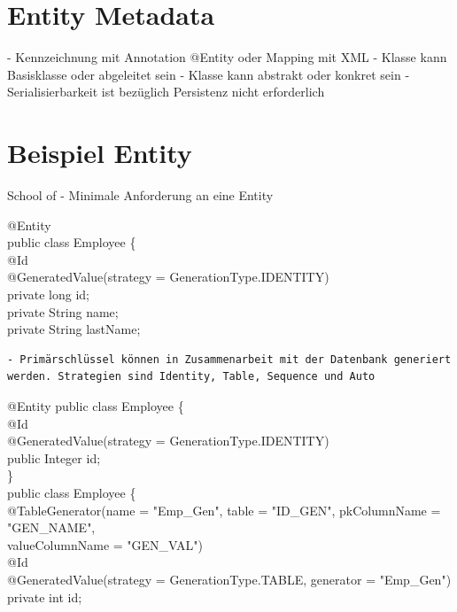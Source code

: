 \documentclass[10pt]{article}
\begin{document}
\section*{Entity Metadata}
- Kennzeichnung mit Annotation @Entity oder Mapping mit XML
- Klasse kann Basisklasse oder abgeleitet sein
- Klasse kann abstrakt oder konkret sein
- Serialisierbarkeit ist bezüglich Persistenz nicht erforderlich

\section*{Beispiel Entity}

School of
- Minimale Anforderung an eine Entity


@Entity\\
public class Employee \{\\
@Id\\
@GeneratedValue(strategy = GenerationType.IDENTITY)\\
private long id;\\
private String name;\\
private String lastName;

\begin{verbatim}
- Primärschlüssel können in Zusammenarbeit mit der Datenbank generiert werden. Strategien sind Identity, Table, Sequence und Auto
\end{verbatim}

@Entity public class Employee \{\\
@Id\\
@GeneratedValue(strategy = GenerationType.IDENTITY)\\
public Integer id;\\
\}\\
public class Employee \{\\
@TableGenerator(name = "Emp\_Gen", table = "ID\_GEN", pkColumnName = "GEN\_NAME",\\
valueColumnName = "GEN\_VAL")\\
@Id\\
@GeneratedValue(strategy = GenerationType.TABLE, generator = "Emp\_Gen")\\
private int id;
\end{document}

